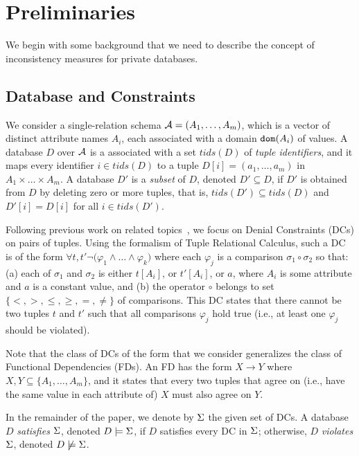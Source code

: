 \section{Preliminaries}\label{sec:prelim}
We begin with some background that we need to describe the concept of inconsistency measures for private databases. 

\def\tids{\mathit{tids}}

\subsection{Database and Constraints}\label{sec:prelim-integrity-constraints}
We consider a single-relation schema $\mathcal{A} = (A_1, \ldots, A_m)$, which is a vector of distinct attribute names $A_i$, each associated with a domain ${\tt dom}(A_i)$ of values. A database $D$ over $\mathcal{A}$ is a associated with a set $\tids(D)$ of \emph{tuple identifiers}, and it maps every identifier $i\in\tids(D)$ to a tuple $D[i]=(a_1,\dots,a_m)$ in $A_1\times\dots\times A_m$. A database $D'$ is a \emph{subset} of $D$, denoted $D'\subseteq D$, if  $D'$ is obtained from $D$ by deleting zero or more tuples, that is, $\tids(D')\subseteq\tids(D)$ and $D'[i]=D[i]$ for all $i\in\tids(D')$.

Following previous work on related topics~\cite{DBLP:journals/pvldb/GeMHI21,DBLP:journals/pvldb/LivshitsHIK20}, we focus on Denial Constraints (DCs) on pairs of tuples. Using the formalism of Tuple Relational Calculus, such a DC is of the form
$\forall t,t' \neg \big(\varphi_1\land\dots\land\varphi_k\big)$ where each $\varphi_j$ is a comparison $\sigma_1\circ\sigma_2$ so that: (a) each of $\sigma_1$ and $\sigma_2$ is either $t[A_i]$, or $t'[A_i]$, or $a$, where $A_i$ is some attribute and $a$ is a constant value, and (b) the operator $\circ$ belongs to set $\{<, >, \leq, \geq, =, \neq\}$ of comparisons. This DC states that there cannot be two tuples $t$ and $t'$ such that all comparisons $\varphi_j$ hold true (i.e., at least one $\varphi_j$ should be violated).

Note that the class of DCs of the form that we consider generalizes the class of Functional Dependencies (FDs). An FD has the form $X\rightarrow Y$ where $X,Y\subseteq\{A_1,\dots,A_m\}$, and it states that every two tuples that agree on (i.e., have the same value in each attribute of) $X$ must also agree on $Y$.

In the remainder of the paper, we denote by ${\Sigma}$ the given set of DCs. A database $D$ \emph{satisfies} ${\Sigma}$, denoted $D \models {\Sigma}$, if $D$
satisfies every DC in ${\Sigma}$; otherwise, $D$ \emph{violates} ${\Sigma}$, denoted $D \not\models {\Sigma}$.

